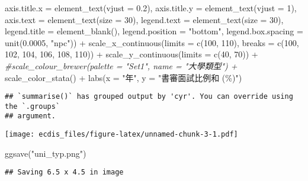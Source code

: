 \documentclass[
]{article}
\newenvironment{Shaded}{\begin{snugshade}}{\end{snugshade}}
\newcommand{\AttributeTok}[1]{\textcolor[rgb]{0.77,0.63,0.00}{#1}}
\newcommand{\CommentTok}[1]{\textcolor[rgb]{0.56,0.35,0.01}{\textit{#1}}}
\newcommand{\DecValTok}[1]{\textcolor[rgb]{0.00,0.00,0.81}{#1}}
\newcommand{\FloatTok}[1]{\textcolor[rgb]{0.00,0.00,0.81}{#1}}
\newcommand{\FunctionTok}[1]{\textcolor[rgb]{0.00,0.00,0.00}{#1}}
\newcommand{\NormalTok}[1]{#1}
\newcommand{\SpecialCharTok}[1]{\textcolor[rgb]{0.00,0.00,0.00}{#1}}
\newcommand{\StringTok}[1]{\textcolor[rgb]{0.31,0.60,0.02}{#1}}
\begin{document}
\begin{Shaded}
\begin{Highlighting}[]
        \AttributeTok{axis.title.x =} \FunctionTok{element\_text}\NormalTok{(}\AttributeTok{vjust =} \FloatTok{0.2}\NormalTok{),}
        \AttributeTok{axis.title.y =} \FunctionTok{element\_text}\NormalTok{(}\AttributeTok{vjust =} \DecValTok{1}\NormalTok{),}
        \AttributeTok{axis.text =} \FunctionTok{element\_text}\NormalTok{(}\AttributeTok{size =} \DecValTok{30}\NormalTok{),}
        \AttributeTok{legend.text =} \FunctionTok{element\_text}\NormalTok{(}\AttributeTok{size =} \DecValTok{30}\NormalTok{),}
        \AttributeTok{legend.title =} \FunctionTok{element\_blank}\NormalTok{(),}
        \AttributeTok{legend.position =} \StringTok{"bottom"}\NormalTok{,}
        \AttributeTok{legend.box.spacing =} \FunctionTok{unit}\NormalTok{(}\FloatTok{0.0005}\NormalTok{, }\StringTok{"npc"}\NormalTok{)) }\SpecialCharTok{+}
  \FunctionTok{scale\_x\_continuous}\NormalTok{(}\AttributeTok{limits =} \FunctionTok{c}\NormalTok{(}\DecValTok{100}\NormalTok{, }\DecValTok{110}\NormalTok{), }\AttributeTok{breaks =} \FunctionTok{c}\NormalTok{(}\DecValTok{100}\NormalTok{, }\DecValTok{102}\NormalTok{, }\DecValTok{104}\NormalTok{, }\DecValTok{106}\NormalTok{, }\DecValTok{108}\NormalTok{, }\DecValTok{110}\NormalTok{)) }\SpecialCharTok{+}
  \FunctionTok{scale\_y\_continuous}\NormalTok{(}\AttributeTok{limits =} \FunctionTok{c}\NormalTok{(}\DecValTok{40}\NormalTok{, }\DecValTok{70}\NormalTok{)) }\SpecialCharTok{+}
  \CommentTok{\#scale\_colour\_brewer(palette = "Set1", name = "大學類型") +}
  \FunctionTok{scale\_color\_stata}\NormalTok{() }\SpecialCharTok{+}
  \FunctionTok{labs}\NormalTok{(}\AttributeTok{x =} \StringTok{"年"}\NormalTok{, }\AttributeTok{y =} \StringTok{"書審面試比例和 (\%)"}\NormalTok{)}
\end{Highlighting}
\end{Shaded}

\begin{verbatim}
## `summarise()` has grouped output by 'cyr'. You can override using the `.groups`
## argument.
\end{verbatim}

\texttt{[image: ecdis\_files/figure-latex/unnamed-chunk-3-1.pdf]}

\begin{Shaded}
\begin{Highlighting}[]
\FunctionTok{ggsave}\NormalTok{(}\StringTok{"uni\_typ.png"}\NormalTok{)}
\end{Highlighting}
\end{Shaded}

\begin{verbatim}
## Saving 6.5 x 4.5 in image
\end{verbatim}
\end{document}
